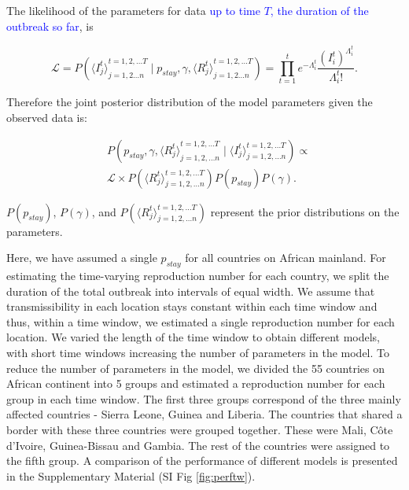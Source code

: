 \documentclass[9pt,twocolumn,twoside,lineno]{pnas-new}
\newcommand{\sangeeta}[1]{\textcolor{blue}{#1}}
\begin{document}
{The likelihood of the parameters for data \sangeeta{up to time $T$, the duration
of the outbreak so far}, is

\begin{equation*}
  \mathcal{L} = P
  \left(
    {\langle I_{j}^{t} \rangle}_{j = 1, 2 \dots n}^{t = 1, 2, \dots T} \mid
    p_{stay},
    \gamma,
    {\langle R_{j}^{t} \rangle}_{j = 1, 2 \dots n}^{t = 1, 2, \dots T}\right) = 
     \prod_{t = 1}^{t}{e^{-\Lambda_{i}^{t}} 
       \frac{\left(I_{i}^{t}\right)^{\Lambda_{i}^{t}}}{\Lambda_{i}^{t} !}}.
  \end{equation*}

Therefore the joint posterior distribution of the model parameters 
given the observed data is:

\begin{equation*}
  \begin{aligned}
  & P\left(p_{stay}, \gamma, {\langle R_{j}^{t}\rangle}_{j = 1, 2, \dots n}^{t = 1, 2, \dots T}
   \mid 
   \langle I_{j}^{t}\rangle_{j = 1, 2, \dots n}^{t = 1, 2, \dots T} \right)
   \propto  \\
   & \mathcal{L} \times 
   P\left(\langle R_{j}^{t}\rangle_{j = 1, 2, \dots n}^{t = 1, 2, \dots T}\right) 
   P\left( p_{stay} \right) P\left( \gamma \right).
   \end{aligned}
\end{equation*}


\(P\left( p_{stay} \right)\), \(P\left( \gamma \right)\), and
\(P\left(\langle R_{j}^{t}\rangle_{j = 1, 2, \dots n}^{t = 1, 2, \dots T}\right)\) represent
the prior distributions on the parameters.

Here, we have assumed a single \(p_{stay}\) for all countries on African
mainland. For estimating the time-varying reproduction number for each
country, we split the duration of the total outbreak into intervals of
equal width. We assume that transmissibility in each location stays
constant within each time window and thus, within a time window, we
estimated a single reproduction number for each location. 
We varied the length of the time window to obtain different models, with short time
windows increasing the number of parameters in the model. 
To reduce
the number of parameters in the model, we divided the 55 countries on
African continent into 5 groups and estimated a reproduction number
for each group in each time window. The first three groups correspond
of the three mainly affected countries - Sierra Leone, Guinea and Liberia.
The countries that shared a border with these three countries
were grouped together. These were Mali, Côte d'Ivoire, Guinea-Bissau
and Gambia. The rest of the countries were assigned to the fifth group.
A comparison
of the performance of different models is presented in the Supplementary
Material (SI Fig \ref{fig:perftw}).

}
\end{document}
